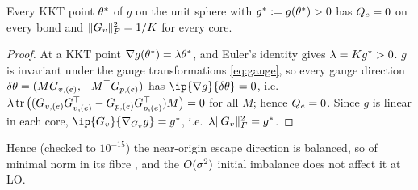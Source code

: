 \begin{proposition}\label{prop:A-kkt}
  \proven{}  Every KKT point $\theta^*$ of $g$ on the unit sphere with
  $g^*:=g(\theta^*)>0$ has $Q_{e}=0$ on every bond and $\lVert G_{v}\rVert_{F}^2=1/K$ for every core.
\end{proposition}
\begin{proof}
  At a KKT point $\nabla g(\theta^*)=\lambda\theta^*$, and Euler's identity gives $\lambda=K g^*>0$.
  $g$ is invariant under the gauge transformations \eqref{eq:gauge}, so every gauge direction
  $\delta\theta=(MG_{v,(e)},-M^{\top}G_{p,(e)})$ has $\ip{\nabla g}{\delta\params}=0$, i.e.\
  $\lambda\operatorname{tr}\big((G_{v,(e)}G_{v,(e)}^{\top}-G_{p,(e)}G_{p,(e)}^{\top})M\big)=0$ for all $M$; hence $Q_{e}=0$. Since $g$
  is linear in each core, $\ip{\G{v}}{\nabla_{\G{v}}g}=g^*$, i.e.\ $\lambda\lVert G_{v}\rVert_{F}^2=g^*$.
\end{proof}
Hence (checked to $10^{-15}$) the near-origin escape direction is balanced, so of minimal norm in its fibre
\citep[Prop.~F.10]{furman2026benign}, and the $O(\sigma^2)$ initial imbalance does not affect it at LO.

